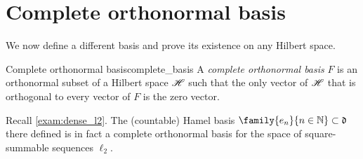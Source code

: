 \section{Complete orthonormal basis}
We now define a different basis and prove its existence on any Hilbert space.
\begin{definition}{Complete orthonormal basis}{complete_basis}
    A \emph{complete orthonormal basis} \(F\) is an orthonormal subset of a Hilbert space \(\mathscr{H}\) such that the only vector of \(\mathscr{H}\) that is orthogonal to every vector of \(F\) is the zero vector.
\end{definition}
\begin{remark}
    Recall \cref{exam:dense_l2}. The (countable) Hamel basis \(\family{e_n}{n \in \mathbb{N}} \subset \mathfrak{d}\) there defined is in fact a complete orthonormal basis for the space of square-summable sequences \(\ell_2\).
\end{remark}

